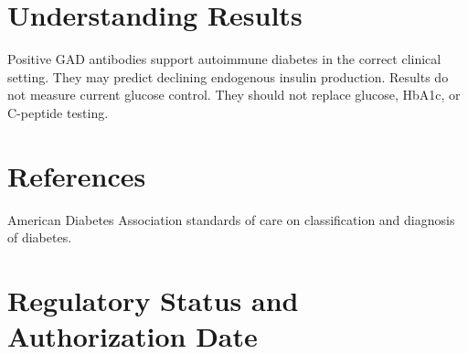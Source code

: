 \section*{Understanding Results}
Positive GAD antibodies support autoimmune diabetes in the correct clinical setting. They may predict declining endogenous insulin production. Results do not measure current glucose control. They should not replace glucose, HbA1c, or C-peptide testing.

\section*{References}
American Diabetes Association standards of care on classification and diagnosis of diabetes.

\clearpage


\section*{Regulatory Status and Authorization Date}

\clearpage
